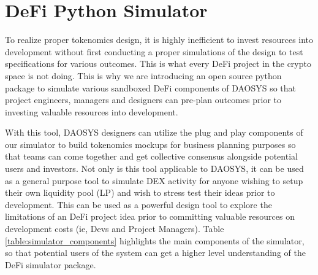 \documentclass[journal,twocolumn,12pt]{ieeesyscoin}
\begin{document}
\section{DeFi Python Simulator}
\label{sec:python_simulator}

To realize proper tokenomics design, it is highly inefficient to invest resources into development without first conducting a proper simulations of the design to test specifications for various outcomes. This is what every DeFi project in the crypto space is not doing. This is why we are introducing an open source python package to simulate various sandboxed DeFi components of DAOSYS so that project engineers, managers and designers can pre-plan outcomes prior to investing valuable resources into development.

With this tool, DAOSYS designers can utilize the plug and play components of our simulator to build tokenomics mockups for business planning purposes so that teams can come together and get collective consensus alongside potential users and investors. Not only is this tool applicable to DAOSYS, it can be used as a general purpose tool to simulate DEX activity for anyone wishing to setup their own liquidity pool (LP) and wish to stress test their ideas prior to development. This can be used as a powerful design tool to explore the limitations of an DeFi project idea prior to committing valuable resources on development costs (ie, Devs and Project Managers). Table \ref{table:simulator_components} highlights the main components of the simulator, so that potential users of the system can get a higher level understanding of the DeFi simulator package.
\end{document}
